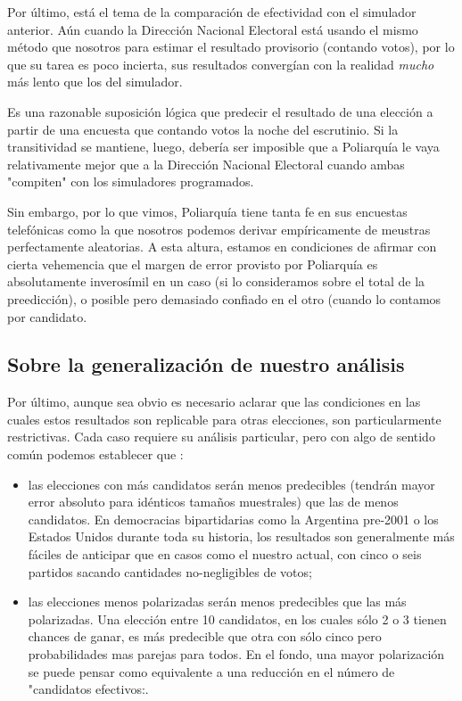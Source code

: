 \documentclass[12pt, a4paper]{article}
\begin{document}
Por \'ultimo, est\'a el tema de la comparaci\'on de efectividad con el simulador anterior. A\'un cuando la Direcci\'on Nacional Electoral est\'a usando el mismo m\'etodo que nosotros para estimar el resultado provisorio (contando votos), por lo que su tarea es poco incierta, sus resultados converg\'ian con la realidad \emph{mucho} m\'as lento que los del simulador.


Es una razonable suposici\'on l\'ogica que predecir el resultado de una elecci\'on a partir de una encuesta que contando votos la noche del escrutinio. Si la transitividad se mantiene, luego, deber\'ia ser imposible que a Poliarqu\'ia le vaya relativamente mejor que a la Direcci\'on Nacional Electoral cuando ambas "compiten" con los simuladores programados.

Sin embargo, por lo que vimos, Poliarqu\'ia tiene tanta fe en sus encuestas telef\'onicas como la que nosotros podemos derivar emp\'iricamente de meustras perfectamente aleatorias. A esta altura, estamos en condiciones de afirmar con cierta vehemencia que el margen de error provisto por Poliarqu\'ia es absolutamente inveros\'imil en un caso (si lo consideramos sobre el total de la preedicci\'on), o posible pero demasiado confiado en el otro (cuando lo contamos por candidato.

\subsection{Sobre la generalizaci\'on de nuestro an\'alisis}

Por \'ultimo, aunque sea obvio es necesario aclarar que las condiciones en las cuales estos resultados son replicable para otras elecciones, son particularmente restrictivas. Cada caso requiere su an\'alisis particular, pero con algo de sentido com\'un podemos establecer que :
\begin{center}
	\begin{itemize}
		\item las elecciones con m\'as candidatos ser\'an menos predecibles (tendr\'an mayor error absoluto para id\'enticos tama\~nos muestrales) que las de menos candidatos. En democracias bipartidarias como la Argentina pre-2001 o los Estados Unidos durante toda su historia, los resultados son generalmente m\'as f\'aciles de anticipar que en casos como el nuestro actual, con cinco o seis partidos sacando cantidades no-negligibles de votos;
		\item las elecciones menos polarizadas ser\'an menos predecibles que las m\'as polarizadas. Una elecci\'on entre 10 candidatos, en los cuales s\'olo 2 o 3 tienen chances de ganar, es m\'as predecible que otra con s\'olo cinco pero probabilidades mas parejas para todos. En el fondo, una mayor polarizaci\'on se puede pensar como equivalente a una reducci\'on en el n\'umero de "candidatos efectivos:.
		\end{itemize}
	\end{center}
\end{document}
